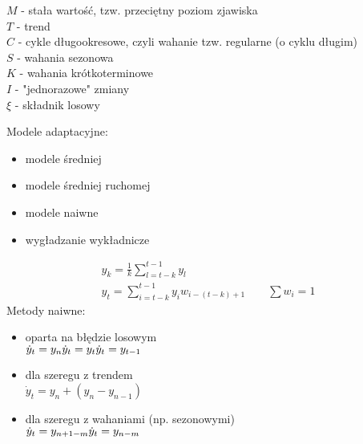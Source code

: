 $ M $ - stała wartość, tzw. przeciętny poziom zjawiska\\
$ T $ - trend\\
$ C $ - cykle długookresowe, czyli wahanie tzw. regularne (o cyklu długim)\\
$ S $ - wahania sezonowa\\
$ K $ - wahania krótkoterminowe\\
$ I $ - "jednorazowe" zmiany\\
$ \xi  $ - składnik losowy

Modele adaptacyjne:
\begin{itemize}
\item modele średniej
\item modele średniej ruchomej
\item modele naiwne
\item wygładzanie wykładnicze
\end{itemize}
\begin{gather*}
y_k=\frac{1}{k}\sum_{l=t-k}^{t-1}y_l\\
y_t=\sum_{i=t-k}^{t-1}y_iw_{i-(t-k)+1}\qquad \sum w_i=1
\end{gather*}
Metody naiwne:
\begin{itemize}
\item oparta na błędzie losowym\\
$ \dot y_t=y_n\\
\dot y_t=y_t\\
\dot y_t=y_{t-1} $
\item dla szeregu z trendem\\
$ \dot y_t=y_n+\left(y_n-y_{n-1}\right) $
\item dla szeregu z wahaniami (np. sezonowymi)\\
$ \dot y_t=y_{n+1-m}\\
\dot y_t=y_{n-m} $
\end{itemize}